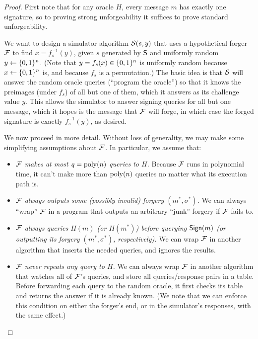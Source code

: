 \documentclass[11pt]{article}
\begin{document}
\begin{proof}
  First note that for any oracle $H$, every message $m$ has exactly
  one signature, so to proving strong unforgeability it suffices to
  prove standard unforgeability.

  We want to design a simulator algorithm $\mathcal{S}(s,y)$ that uses a
  hypothetical forger $\mathcal{F}$ to find $x = f_{s}^{-1}(y)$, given $s$
  generated by $\mathsf{S}$ and uniformly random $y \gets \{0,1\}^{n}$.
  (Note that $y = f_{s}(x) \in \{0,1\}^{n}$ is uniformly random because
  $x \gets \{0,1\}^{n}$ is, and because $f_{s}$ is a permutation.)  The
  basic idea is that $\mathcal{S}$ will answer the random oracle queries
  (``program the oracle'') so that it knows the preimages (under
  $f_{s}$) of all but one of them, which it answers as its challenge
  value $y$.  This allows the simulator to answer signing queries for
  all but one message, which it hopes is the message that $\mathcal{F}$ will
  forge, in which case the forged signature is exactly
  $f_{s}^{-1}(y)$, as desired.

  We now proceed in more detail.  Without loss of generality, we may
  make some simplifying assumptions about $\mathcal{F}$.  In particular, we
  assume that:
  \begin{itemize}
  \item \emph{$\mathcal{F}$ makes at most $q=\operatorname{poly}(n)$ queries to $H$.}
    Because $\mathcal{F}$ runs in polynomial time, it can't make more than
    $\operatorname{poly}(n)$ queries no matter what its execution path is.
  \item \emph{$\mathcal{F}$ always outputs some (possibly invalid) forgery
      $(m^{*}, \sigma^{*})$.}  We can always ``wrap'' $\mathcal{F}$ in a
    program that outputs an arbitrary ``junk'' forgery if $\mathcal{F}$
    fails to.
  \item \emph{$\mathcal{F}$ always queries $H(m)$ (or $H(m^{*})$) before
      querying $\mathsf{Sign}(m)$ (or outputting its forgery
      $(m^*,\sigma^*)$, respectively).}  We can wrap $\mathcal{F}$ in another
    algorithm that inserts the needed queries, and ignores the
    results.
  \item \emph{$\mathcal{F}$ never repeats any query to $H$.}  We can always
    wrap $\mathcal{F}$ in another algorithm that watches all of $\mathcal{F}$'s
    queries, and store all queries/response pairs in a table.  Before
    forwarding each query to the random oracle, it first checks its
    table and returns the answer if it is already known.  (We note
    that we can enforce this condition on either the forger's end, or
    in the simulator's responses, with the same effect.)
  \end{itemize}


\end{proof}
\end{document}
